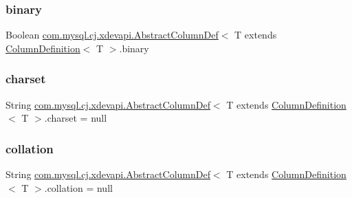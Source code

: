\subsubsection{\texorpdfstring{binary}{binary}}
{\footnotesize\ttfamily Boolean \mbox{\hyperlink{classcom_1_1mysql_1_1cj_1_1xdevapi_1_1_abstract_column_def}{com.\+mysql.\+cj.\+xdevapi.\+Abstract\+Column\+Def}}$<$ T extends \mbox{\hyperlink{interfacecom_1_1mysql_1_1cj_1_1protocol_1_1_column_definition}{Column\+Definition}}$<$ T $>$.binary\hspace{0.3cm}{\ttfamily [protected]}}

\mbox{\label{classcom_1_1mysql_1_1cj_1_1xdevapi_1_1_abstract_column_def_a9fe0a018372ddc610696b8ff8c6150f6}} 
\subsubsection{\texorpdfstring{charset}{charset}}
{\footnotesize\ttfamily String \mbox{\hyperlink{classcom_1_1mysql_1_1cj_1_1xdevapi_1_1_abstract_column_def}{com.\+mysql.\+cj.\+xdevapi.\+Abstract\+Column\+Def}}$<$ T extends \mbox{\hyperlink{interfacecom_1_1mysql_1_1cj_1_1protocol_1_1_column_definition}{Column\+Definition}}$<$ T $>$.charset = null\hspace{0.3cm}{\ttfamily [protected]}}

\mbox{\label{classcom_1_1mysql_1_1cj_1_1xdevapi_1_1_abstract_column_def_a1abcf922d11f6c95966ce2b4e52e9e55}} 
\subsubsection{\texorpdfstring{collation}{collation}}
{\footnotesize\ttfamily String \mbox{\hyperlink{classcom_1_1mysql_1_1cj_1_1xdevapi_1_1_abstract_column_def}{com.\+mysql.\+cj.\+xdevapi.\+Abstract\+Column\+Def}}$<$ T extends \mbox{\hyperlink{interfacecom_1_1mysql_1_1cj_1_1protocol_1_1_column_definition}{Column\+Definition}}$<$ T $>$.collation = null\hspace{0.3cm}{\ttfamily [protected]}}

